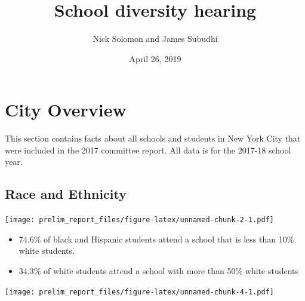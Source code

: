 \documentclass[11pt,]{article}
\title{School diversity hearing}
\author{Nick Solomon and James Subudhi}
\date{April 26, 2019}
\providecommand{\tightlist}{%
  \setlength{\itemsep}{0pt}\setlength{\parskip}{0pt}}
\begin{document}
\maketitle
\thispagestyle{fancy}

\hypertarget{city-overview}{%
\section{City Overview}\label{city-overview}}

This section contains facts about all schools and students in New York City that were included in the 2017 committee report. All data is for the 2017-18 school year.

\hypertarget{race-and-ethnicity}{%
\subsection{Race and Ethnicity}\label{race-and-ethnicity}}

\texttt{[image: prelim\_report\_files/figure-latex/unnamed-chunk-2-1.pdf]}
\begin{itemize}
\tightlist
\item
  74.6\% of black and Hispanic students attend a school that is less than 10\% white students.
\item
  34.3\% of white students attend a school with more than 50\% white students
\end{itemize}
\texttt{[image: prelim\_report\_files/figure-latex/unnamed-chunk-4-1.pdf]}
\end{document}
